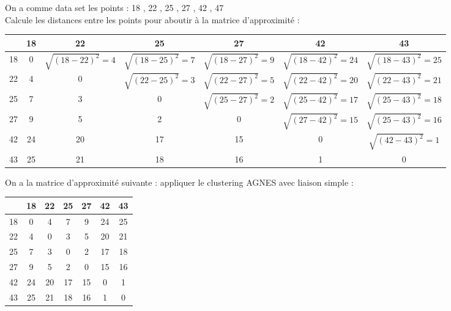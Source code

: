 \documentclass{article}
\begin{document}
\vspace{1cm}
On a comme data set les points : 18 , 22 , 25 , 27 , 42 , 47\\[0.1cm]
Calcule les distances entre les points pour aboutir à la matrice d'approximité :
\begin{table}[h]
\centering

\renewcommand{\arraystretch}{1.75} 
\setlength{\tabcolsep}{7pt}      


\begin{tabular}{|c|c|c|c|c|c|c|} 

\hline
 & 18 & 22 & 25 & 27 & 42 & 43 \\ \hline
18& 0 & $\sqrt{(18-22)^2} = 4$ &  $\sqrt{(18-25)^2} = 7$  & $\sqrt{(18-27)^2} = 9$ & $\sqrt{(18-42)^2} = 24$ & $\sqrt{(18-43)^2} = 25$ \\ \hline
22 & 4 &0 & $\sqrt{(22-25)^2} = 3$ & $\sqrt{(22-27)^2} = 5$ & $\sqrt{(22-42)^2} = 20$ & $\sqrt{(22-43)^2} = 21$ \\ \hline
25 & 7 & 3 & 0 & $\sqrt{(25-27)^2} = 2$ & $\sqrt{(25-42)^2} = 17$ & $\sqrt{(25-43)^2} = 18$ \\ \hline
27 & 9 & 5 & 2 & 0 & $\sqrt{(27-42)^2} = 15$ & $\sqrt{(25-43)^2} = 16$ \\ \hline
42 &24 & 20 & 17 & 15 &0 & $\sqrt{(42-43)^2} = 1$ \\ \hline
43 &25 & 21 &  18 & 16 &1 & 0 \\ \hline
\end{tabular}
\end{table}


\vspace{0.15cm}

On a la matrice d'approximité suivante : appliquer le clustering AGNES avec liaison simple :

\begin{table}[h]
\centering

\renewcommand{\arraystretch}{1.75} 
\setlength{\tabcolsep}{12pt}      


\begin{tabular}{|c|c|c|c|c|y|y|} \hline
   & 18 & 22 & 25 & 27 & 42 & 43 \\  & 0  & 4  & 7  & 9  & 24 & 25 \\  & 4  & 0  & 3  & 5  & 20 & 21 \\  & 7  & 3  & 0  & 2  & 17 & 18 \\  & 9  & 5  & 2  & 0  & 15 & 16 \\ \hline
{} 42 & 24 & 20 & 17 & 15 & 0  & 1  \\ \hline
{} 43 & 25 & 21 & 18 & 16 & 1  & 0  \\ \hline
\end{tabular}
\end{table}
\end{document}
